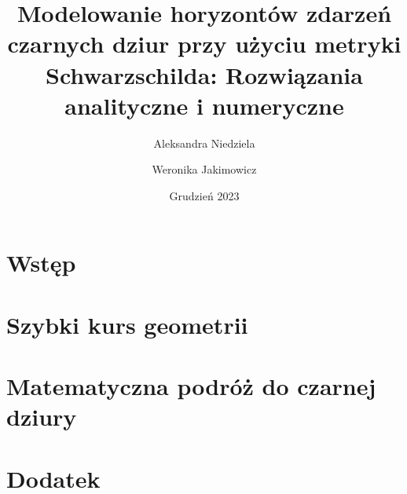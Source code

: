 \documentclass[14pt]{extarticle}
\title{Modelowanie horyzontów zdarzeń czarnych dziur przy użyciu metryki Schwarzschilda: Rozwiązania analityczne i numeryczne}
\author{Aleksandra Niedziela \and Weronika Jakimowicz}
\date{Grudzień 2023}
\begin{document}
\maketitle 
\thispagestyle{empty}
\newpage

\tableofcontents 
\newpage
\setcounter{page}{1}

\section{Wstęp}






\section{Szybki kurs geometrii}





\section{Matematyczna podróż do czarnej dziury}

 
%
%
%
%

\section{Dodatek}





\end{document}
